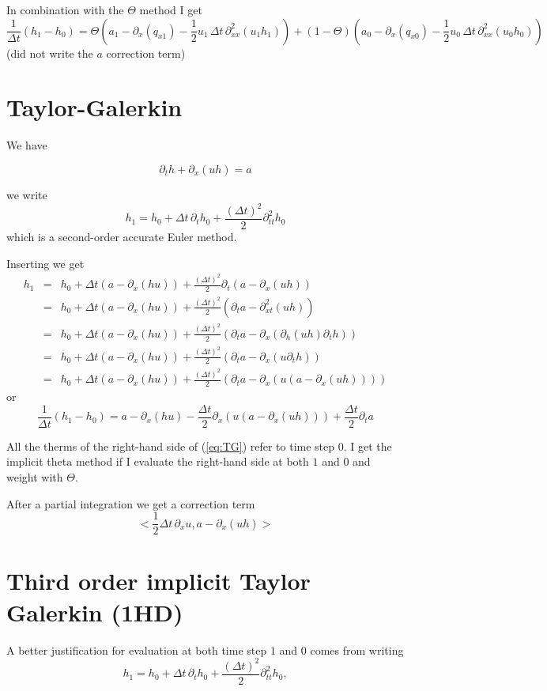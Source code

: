 \documentclass[10pt,a4paper]{book}
\newcommand{\p}{\partial}
\begin{document}
In combination with the $\Theta$ method I get
\[
\frac{1}{\Delta t} ( h_1 - h_0 ) = \Theta \left ( a_1 - \partial_x (q_{x1})  - \frac{1}{2} u_1 \, \Delta t   \, \partial^2_{xx} (u_1 h_1) \right )
+ (1-\Theta) \left ( a_0 - \partial_x (q_{x0})  - \frac{1}{2} u_0 \, \Delta t   \, \partial^2_{xx} (u_0 h_0)  \right ) 
\]
(did not write the $a$ correction term)

\section{Taylor-Galerkin}

We have

\[ \partial_t h + \partial_x (u h)=a  \]

we write
\[
h_1=h_0+ \Delta t \, \p_t h_0 + \frac{(\Delta t)^2}{2} \p^2_{tt} h_0 
\] 
which is a second-order accurate Euler method.

Inserting we get
\begin{eqnarray}
h_1&=&h_0+ \Delta t (a - \p_x (h u)) + \frac{(\Delta t)^2}{2} \p_t (a- \p_x (u h)) \nonumber \\
   &=&h_0+ \Delta t (a - \p_x (h u)) + \frac{(\Delta t)^2}{2} ( \p_t a- \p^2_{xt}  (u h)) \nonumber \\
   &=&h_0+ \Delta t (a - \p_x (h u)) + \frac{(\Delta t)^2}{2} ( \p_t a- \p_x (\p_h (u h) \p_t h)) \nonumber \\
   &=&h_0+ \Delta t (a - \p_x (h u)) + \frac{(\Delta t)^2}{2} ( \p_t a- \p_x  (u \p_t h)) \nonumber \\
   &=&h_0+ \Delta t (a - \p_x (h u)) + \frac{(\Delta t)^2}{2} ( \p_t a- \p_x  (u (a-\p_x (u h)))) \nonumber 
\end{eqnarray}
or
\begin{equation}
\frac{1}{\Delta t} (h_1-h_0) = a - \p_x (h u) - \frac{\Delta t}{2} \p_x  (u (a-\p_x (u h)))
+ \frac{\Delta t}{2} \p_t a
\label{eq:TG}
\end{equation}

All the therms of the right-hand side of (\ref{eq:TG}) refer to time step $0$. I get the implicit
theta method if I evaluate the right-hand side at both $1$ and $0$ and weight with $\Theta$.

After a partial integration we get a correction term
\[
< \frac{1}{2} \Delta t \, \p_x u , a- \p_x(uh)>
\]


\section{Third order implicit Taylor Galerkin (1HD)}
A better justification for evaluation at both time step $1$ and $0$ comes from writing
\[
h_1=h_0+ \Delta t \, \p_t h_0 + \frac{(\Delta t)^2}{2} \p^2_{tt} h_0 ,
\] 
\end{document}
